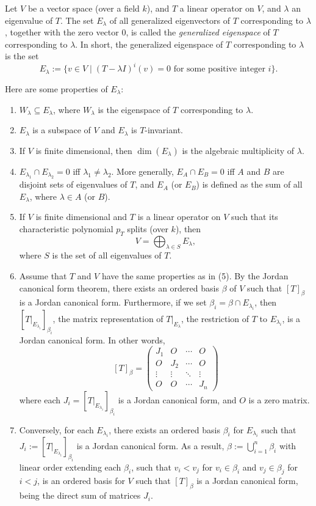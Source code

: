 \documentclass[12pt]{article}
\begin{document}
Let $V$ be a vector space (over a field $k$), and $T$ a linear operator on $V$, and $\lambda$ an eigenvalue of $T$.  The set $E_{\lambda}$ of all generalized eigenvectors of $T$ corresponding to $\lambda$, together with the zero vector $0$, is called the \emph{generalized eigenspace} of $T$ corresponding to $\lambda$.  In short, the generalized eigenspace of $T$ corresponding to $\lambda$ is the set $$E_{\lambda}:=\lbrace v\in V\mid (T-\lambda I)^i(v)=0\textrm{ for some positive integer }i\rbrace.$$

Here are some properties of $E_{\lambda}$:
\begin{enumerate}
\item $W_{\lambda}\subseteq E_{\lambda}$, where $W_{\lambda}$ is the eigenspace of $T$ corresponding to $\lambda$.
\item $E_{\lambda}$ is a subspace of $V$ and $E_{\lambda}$ is $T$-invariant.
\item If $V$ is finite dimensional, then $\dim(E_{\lambda})$ is the algebraic multiplicity of $\lambda$.
\item $E_{\lambda_1}\cap E_{\lambda_2}=0$ iff $\lambda_1\ne \lambda_2$.  More generally, $E_A\cap E_B=0$ iff $A$ and $B$ are disjoint sets of eigenvalues of $T$, and $E_A$ (or $E_B$) is defined as the sum of all $E_{\lambda}$, where $\lambda\in A$ (or $B$).
\item If $V$ is finite dimensional and $T$ is a linear operator on $V$ such that its characteristic polynomial $p_T$ splits (over $k$), then $$V=\bigoplus_{\lambda\in S} E_{\lambda},$$ where $S$ is the set of all eigenvalues of $T$.
\item Assume that $T$ and $V$ have the same properties as in (5).  By the Jordan canonical form theorem, there exists an ordered basis $\beta$ of $V$ such that $[T]_{\beta}$ is a Jordan canonical form.  Furthermore, if we set $\beta_i=\beta \cap E_{\lambda_i}$, then $[T|_{E_{\lambda_i}}]_{\beta_i}$, the matrix representation of $T|_{E_{\lambda}}$, the restriction of $T$ to $E_{\lambda_i}$, is a Jordan canonical form.  In other words, 
$$[T]_{\beta}=\begin{pmatrix}
J_{1} & O & \cdots & O\\
O & J_{2} & \cdots & O\\
\vdots & \vdots & \ddots & \vdots \\
O & O & \cdots & J_{n}
\end{pmatrix}$$
where each $J_i=[T|_{E_{\lambda_i}}]_{\beta_i}$ is a Jordan canonical form, and $O$ is a zero matrix.
\item Conversely, for each $E_{\lambda_i}$, there exists an ordered basis $\beta_i$ for $E_{\lambda_i}$ such that $J_i:=[T|_{E_{\lambda_i}}]_{\beta_i}$ is a Jordan canonical form.  As a result, $\beta:=\bigcup_{i=1}^n \beta_i$ with linear order extending each $\beta_i$, such that $v_i<v_j$ for $v_i\in \beta_i$ and $v_j\in \beta_j$ for $i<j$, is an ordered basis for $V$ such that $[T]_{\beta}$ is a Jordan canonical form, being the direct sum of matrices $J_i$.

\end{enumerate}
\end{document}
